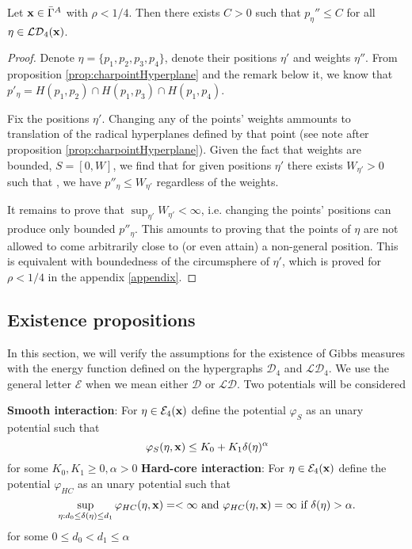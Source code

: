 \begin{proposition}\label{prop:maxPeta}
Let ${\mathbf{x}} \in \bar\Gamma^A$ with $\rho < 1/4$. Then there exists $C>0$ such that $p_\eta'' \leq C$ for all $\eta \in \mathcal {LD}_4({\mathbf{x}})$. 
\end{proposition}
\begin{proof}
Denote $\eta=\{p_1,p_2,p_3,p_4\}$, denote their positions $\eta'$ and weights $\eta''$. From proposition \ref{prop:charpointHyperplane} and the remark below it, we know that $p'_\eta = H(p_1,p_2)\cap H(p_1,p_3) \cap H(p_1,p_4)$.

Fix the positions $\eta'$.  Changing any of the points' weights ammounts to translation of the radical hyperplanes defined by that point (see note after proposition \ref{prop:charpointHyperplane}). Given the fact that weights are bounded, $S=[0,W]$, we find that for given positions $\eta'$ there exists $W_{\eta'}>0$ such that , we have $p''_\eta \leq W_{\eta'}$ regardless of the weights.

It remains to prove that $\sup_{\eta'} W_{\eta'} < \infty$, i.e. changing the points' positions can produce only bounded $p''_\eta$. This amounts to proving that the points of $\eta$ are not allowed to come arbitrarily close to (or even attain) a non-general position. This is equivalent with boundedness of the circumsphere of $\eta'$, which is proved for $\rho<1/4$ in the appendix \ref{appendix}.
\end{proof}



\subsection{Existence propositions}
In this section, we will verify the assumptions for the existence of Gibbs measures with the energy function defined on the hypergraphs $\mathcal D_4$ and $\mathcal {LD}_4$. We use the general letter $\mathcal E$ when we mean either $\mathcal D$ or $\mathcal {LD}$. Two potentials will be considered

\textbf{Smooth interaction}:  For $\eta\in\mathcal E_4({\mathbf{x}})$ define the potential $\varphi_S$ as an unary potential such that
$$\varphi_S(\eta,{\mathbf{x}}) \leq K_0 + K_1 \delta(\eta)^{\alpha}$$
for some $K_0,K_1 \geq 0, \alpha >0$\newline
\textbf{Hard-core interaction}: For $\eta\in\mathcal E_4({\mathbf{x}})$ define the potential $\varphi_{HC}$ as an unary potential such that
$$\sup_{\eta: d_0 \leq \delta(\eta) \leq d_1} \varphi_{HC}(\eta,{\mathbf{x}}) = < \infty \text{ and } \varphi_{HC}(\eta,{\mathbf{x}})=\infty \text{ if } \delta(\eta)>\alpha.$$ 
for some $0\leq d_0 < d_1 \leq \alpha$ 


